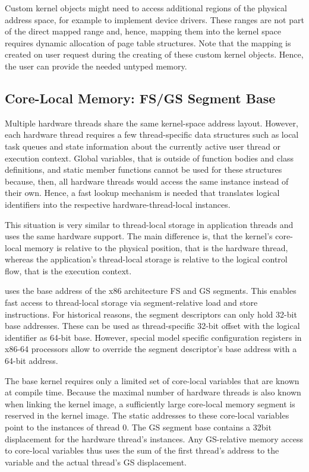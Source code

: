 Custom kernel objects might need to access additional regions of the physical address space, for example to implement device drivers. These ranges are not part of the direct mapped range and, hence, mapping them into the kernel space requires dynamic allocation of page table structures. Note that the mapping is created on user request during the creating of these custom kernel objects. Hence, the user can provide the needed untyped memory.

\subsection{Core-Local Memory: FS/GS Segment Base}
Multiple hardware threads share the same kernel-space address layout. However, each hardware thread requires a few thread-specific data structures such as local task queues and state information about the currently active user thread or execution context. Global variables, that is outside of function bodies and class definitions, and static member functions cannot be used for these structures because, then, all hardware threads would access the same instance instead of their own. Hence, a fast lookup mechanism is needed that translates logical identifiers into the respective hardware-thread-local instances.

This situation is very similar to thread-local storage in application threads and uses the same hardware support. The main difference is, that the kernel's core-local memory is relative to the physical position, that is the hardware thread, whereas the application's thread-local storage is relative to the logical control flow, that is the execution context.

\mythos uses the base address of the x86 architecture FS and GS segments. This enables fast access to thread-local storage via segment-relative load and store instructions. For historical reasons, the segment descriptors can only hold 32-bit base addresses. These can be used as thread-specific 32-bit offset with the logical identifier as 64-bit base. However, special model specific configuration registers in x86-64 processors allow to override the segment descriptor's base address with a 64-bit address.

The base kernel requires only a limited set of core-local variables that are known at compile time. Because the maximal number of hardware threads is also known when linking the kernel image, a sufficiently large core-local memory segment is reserved in the kernel image. The static addresses to these core-local variables point to the instances of thread 0. The GS segment base contains a 32bit displacement for the hardware thread's instances. Any GS-relative memory access to core-local variables thus uses the sum of the first thread's address to the variable and the actual thread's GS displacement. 

